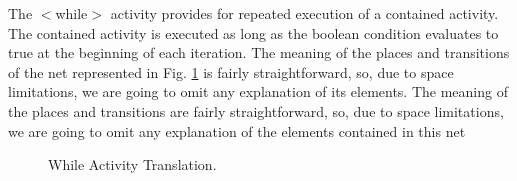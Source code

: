 The $<$while$>$ activity provides for repeated execution of a contained activity. The contained 
activity is executed as long as the boolean condition evaluates to true at the beginning of 
each iteration. The meaning of the places and transitions of the net represented in Fig. \ref{while} is fairly straightforward, so, due to space limitations, we are going to omit any explanation of its elements. 
The meaning of the places and transitions are fairly straightforward, so, due to space limitations, we are going to omit any explanation of the elements contained in this net 

\begin{figure}[!ht]
\begin{center}
\end{center}
\caption{\label{while} While Activity Translation.}
\vspace{-0.7cm}
\end{figure}
\vspace{-0.5cm}
